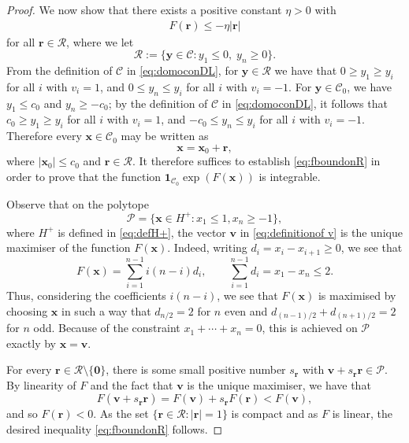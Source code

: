 \documentclass[11pt,reqno]{amsart}
\theoremstyle{definition}
\theoremstyle{remark}
\numberwithin{equation}{section}
\numberwithin{thm}{section}
\numberwithin{table}{section}
\newcommand{\y}{\mathbf{y}}
\newcommand{\x}{\mathbf{x}}
\begin{document}
\begin{proof}
    We now show that there exists a positive constant $\eta > 0$ with
    \begin{align}\label{eq:fboundonR}
         F(\mathbf{r}) \le - \eta | \mathbf{r} |
    \end{align}
    for all $\mathbf{r} \in \mathcal{R}$, where we let 
    \[ \mathcal{R}:= \{\y \in \mathcal{C}: y_1 \le 0, \; y_n \ge 0 \} .
    \]
     From the definition of $\mathcal{C}$ in \eqref{eq:domoconDL}, for $\y \in \mathcal{R}$ we have that
     $0 \ge y_1 \ge y_i$ for all $i$ with $v_i =1$, and  $0 \le y_n \le y_i$ for all $i$ with $v_i =-1$.
    For $\y \in \mathcal{C}_0$, we have $y_1 \le c_0$ and $y_n \ge -c_0$; by the definition of $\mathcal{C}$ in \eqref{eq:domoconDL}, it follows that 
    $c_0 \ge y_1 \ge y_i$ for all $i$ with $v_i =1$, and  $-c_0 \le y_n \le y_i$ for all $i$ with $v_i =-1$. Therefore every $\x \in \mathcal{C}_0$ may be written as 
    \[
    \x = \x_0 + \mathbf{r}, 
    \]
where $|\x_0| \le c_0$ and $\mathbf{r} \in \mathcal{R}$.
    It therefore suffices
    to establish \eqref{eq:fboundonR}  in order to prove that the function $\mathbf{1}_{\mathcal{C}_0} \exp(F(\x))$ is integrable.
    
    Observe that on the polytope 
    \[
    \mathcal{P} = \{ 
    \mathbf{x} \in H^+: x_1 \le 1, x_n \ge -1 
    \},
    \]
    where $H^{+}$ is defined in \eqref{eq:defH+},
    the vector $\mathbf{v}$  in \eqref{eq:definitionof v} is the unique maximiser of the function $F(\x)$. 
    Indeed, writing $d_i = x_{i} - x_{i+1} \ge 0$, we see that 
    \[
    F(\x) = \sum_{i=1}^{n-1} i(n-i)d_i, \qquad \sum_{i=1}^{n-1} d_i = x_1 - x_n \le 2.
    \]
    Thus, considering the coefficients $i(n-i)$, we see that $F(\x)$ is maximised by  choosing $\x$ in such a way that $d_{n/2} = 2$ for $n$ even and $d_{(n-1)/2}+d_{(n+1)/2}=2$ for $n$ odd. Because of the constraint $ x_1 + \cdots + x_n = 0$, this is achieved on $\mathcal{P}$ exactly by $\x=\mathbf{v}$. 

    For every $\mathbf{r} \in \mathcal{R} \setminus \{\mathbf{0}\}$, there is some small positive number $s_\mathbf{r}$ with $\mathbf{v} + s_\mathbf{r}\mathbf{r} \in \mathcal{P}$. By linearity of $F$ and the fact that $\mathbf{v}$ is the unique maximiser, we have that 
    \[
    F(\mathbf{v} + s_\mathbf{r}  \mathbf{r}) = F(\mathbf{v}) + s_\mathbf{r} F(\mathbf{r}) < F(\mathbf{v}), 
    \]
    and so $F(\mathbf{r}) < 0$. As the set $\{ \mathbf{r} \in \mathcal{R}: | \mathbf{r}| =1 \}$ is compact and as $F$ is linear, the desired inequality  \eqref{eq:fboundonR} follows.


\end{proof}
\end{document}
